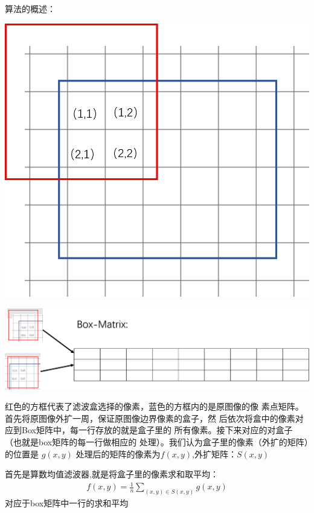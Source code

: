 \documentclass{article}
\begin{document}
    算法的概述：

        \includegraphics[width=0.8\linewidth]{img/ref1.png}   
    
        \includegraphics[width=0.8\linewidth]{img/ref2.png}

    红色的方框代表了滤波盒选择的像素，蓝色的方框内的是原图像的像
    素点矩阵。首先将原图像外扩一周，保证原图像边界像素的盒子，然
    后依次将盒中的像素对应到Box矩阵中，每一行存放的就是盒子里的
    所有像素。接下来对应的对盒子（也就是box矩阵的每一行做相应的
处理）。我们认为盒子里的像素（外扩的矩阵）的位置是 $ g(x,y) $
    处理后的矩阵的像素为$f(x,y)$,外扩矩阵：$S(x,y)$

    首先是算数均值滤波器,就是将盒子里的像素求和取平均：\\

    \begin{align}
        f(x,y) = \frac{1}{n} \sum_{(x,y)\in S(x,y)} g(x,y)
    \end{align}
    对应于box矩阵中一行的求和平均
    
\end{document}

